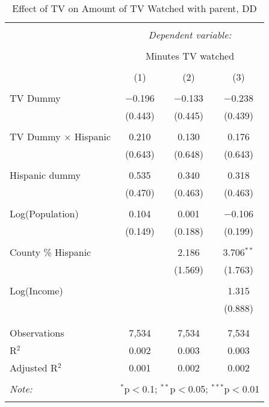 
\begin{table}[!htbp] \centering 
  \caption{Effect of TV on Amount of TV Watched with parent, DD} 
  \label{} 
\begin{tabular}{@{\extracolsep{-5pt}}lccc} 
\\[-1.8ex]\hline 
\hline \\[-1.8ex] 
 & \multicolumn{3}{c}{\textit{Dependent variable:}} \\ 
\cline{2-4} 
\\[-1.8ex] & \multicolumn{3}{c}{Minutes TV watched} \\ 
\\[-1.8ex] & (1) & (2) & (3)\\ 
\hline \\[-1.8ex] 
 TV Dummy & $-$0.196 & $-$0.133 & $-$0.238 \\ 
  & (0.443) & (0.445) & (0.439) \\ 
  & & & \\ 
 TV Dummy $\times$ Hispanic  & 0.210 & 0.130 & 0.176 \\ 
  & (0.643) & (0.648) & (0.643) \\ 
  & & & \\ 
 Hispanic dummy & 0.535 & 0.340 & 0.318 \\ 
  & (0.470) & (0.463) & (0.463) \\ 
  & & & \\ 
 Log(Population) & 0.104 & 0.001 & $-$0.106 \\ 
  & (0.149) & (0.188) & (0.199) \\ 
  & & & \\ 
 County \% Hispanic &  & 2.186 & 3.706$^{**}$ \\ 
  &  & (1.569) & (1.763) \\ 
  & & & \\ 
 Log(Income) &  &  & 1.315 \\ 
  &  &  & (0.888) \\ 
  & & & \\ 
\hline \\[-1.8ex] 
Observations & 7,534 & 7,534 & 7,534 \\ 
R$^{2}$ & 0.002 & 0.003 & 0.003 \\ 
Adjusted R$^{2}$ & 0.001 & 0.002 & 0.002 \\ 
\hline 
\hline \\[-1.8ex] 
\textit{Note:}  & \multicolumn{3}{r}{$^{*}$p$<$0.1; $^{**}$p$<$0.05; $^{***}$p$<$0.01} \\ 
 & \multicolumn{3}{r}{} \\ 
\end{tabular} 
\end{table} 
